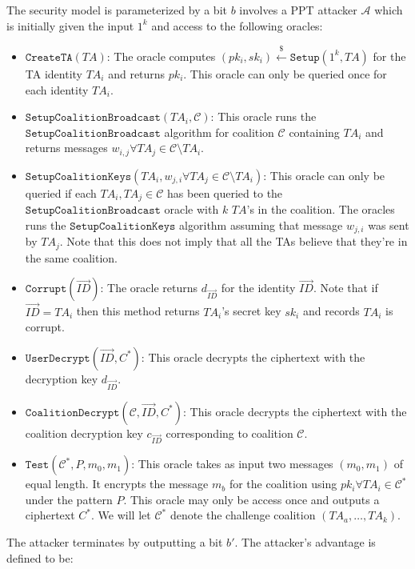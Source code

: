 \documentclass[10pt]{llncs}
\newcommand{\A}{\mathcal{A}}
\newcommand{\C}{\mathcal{C}}
\newcommand{\ID}{\mathit{ID}}
\newcommand{\TA}{\mathit{TA}}
\newcommand{\getsr}{\stackrel{{\scriptscriptstyle\$}}{\gets}}
\begin{document}
The security model is parameterized by a bit $b$ involves a PPT attacker $\A$ which is initially given the input $1^k$ and access to the following oracles:
\begin{itemize}
\item $\texttt{CreateTA}(\TA)$: The oracle computes $(pk_i,sk_i)\getsr \texttt{Setup}(1^{k},\TA)$ for the TA identity $\TA_i$ and returns $pk_i$. This oracle can only be queried once for each identity $\TA_i$.
\medskip

\item $\texttt{SetupCoalitionBroadcast}(\TA_i,\C)$: This oracle runs the $\texttt{SetupCoalitionBroadcast}$ algorithm for coalition $\C$ containing $\TA_i$ and returns messages $w_{i,j} \forall \TA_j \in \C \setminus \TA_i$.
\medskip

\item $\texttt{SetupCoalitionKeys}(\TA_i, w_{j,i}\forall \TA_j \in \C \setminus \TA_i)$: This oracle can only be queried if each $\TA_i, \TA_j \in \C$ has been queried to the $\texttt{SetupCoalitionBroadcast}$ oracle with $k$ $\TA$'s in the coalition. The oracles runs the $\texttt{SetupCoalitionKeys}$ algorithm assuming that message $w_{j,i}$ was sent by $\TA_{j}$. Note that this does not imply that all the TAs believe that they're in the same coalition.
\medskip

\item $\texttt{Corrupt}(\vec{\ID})$: The oracle returns $d_{\vec{\ID}}$ for the identity $\vec{\ID}$.  Note that if $\vec{\ID} = TA_i$ then this method returns $\TA_i$'s secret key $sk_i$ and records $\TA_i$ is corrupt.
\medskip

\item $\texttt{UserDecrypt}(\vec{\ID},C^{*})$: This oracle decrypts the ciphertext with the decryption key $d_{\vec{\ID}}$.
\medskip

\item $\texttt{CoalitionDecrypt}(\C,\vec{\ID},C^{*})$: This oracle decrypts the ciphertext with the coalition decryption key $c_{\vec{\ID}}$ corresponding to coalition $\C$.
\medskip

\item $\texttt{Test}(\C^*,\mathit{P},m_{0},m_{1})$: This oracle takes as input two messages $(m_{0},m_{1})$ of equal length. It encrypts the message $m_{b}$ for the coalition using $pk_i \forall \TA_i \in \C^*$ under the pattern $\mathit{P}$. This oracle may only be access once and outputs a ciphertext $C^{*}$. We will let $\C^*$ denote the challenge coalition $(\TA_{a},\ldots,\TA_{k})$.
\end{itemize}
The attacker terminates by outputting a bit $b'$. The attacker's advantage is defined to be:
\end{document}
